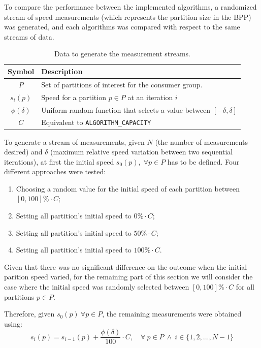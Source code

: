 To compare the performance between the implemented algorithms, a randomized
stream of speed measurements (which represents the partition size in the BPP)
was generated, and each algorithms was compared with respect to the same streams
of data. 

\begin{table}[H] 
\centering 
\caption{Data to generate the measurement streams.} 
\label{table:testing_data} 
\begin{tabular}{ |c|l| } 
    \hline 
    \textbf{Symbol} & \textbf{Description} \\ 
    \hline 
    $P$ & Set of partitions of interest for the consumer group. \\ 
    $s_i(p)$ & Speed for a partition $p \in P$ at an iteration $i$ \\ 
    $\phi(\delta)$ & Uniform random function that selects a value between $[-\delta, \delta]$\\
    $C$ & Equivalent to \lstinline$ALGORITHM_CAPACITY$ \\
    \hline 
\end{tabular} 
\end{table}

To generate a stream of measurements, given $N$ (the number of measurements
desired) and $\delta$ (maximum relative speed variation between two sequential
iterations), at first the initial speed $s_0(p), \; \forall p \in P$ has to be
defined. Four different approaches were tested:
\begin{enumerate}
    \item Choosing a random value for the initial speed of each partition
        between $[0, 100]\% \cdot C$;
    \item Setting all partition's initial speed to $0\% \cdot C$;
    \item Setting all partition's initial speed to $50\% \cdot C$;
    \item Setting all partition's initial speed to $100\% \cdot C$.
\end{enumerate}

Given that there was no significant difference on the outcome when the initial
parition speed varied, for the remaining part of this section we will consider
the case where the initial speed was randomly selected between $[0, 100]\% \cdot
C$ for all partitions $p \in P$.

Therefore, given $s_0(p)\ \forall p \in P$, the remaining measurements were
obtained using: 
\begin{equation}
    s_i(p) = s_{i-1}(p) + \frac{\phi(\delta)}{100} \cdot C, \quad 
        \forall \ p \in P \ \wedge \ 
        i \in \{1, 2, ..., N-1\}
\end{equation}

